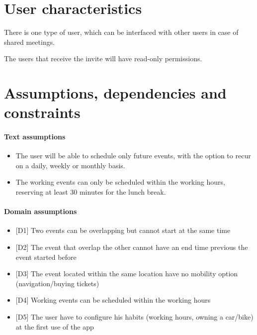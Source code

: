 \section{User characteristics}
\label{sec:usercharacteristics}
\begin{description}
	\item There is one type of user, which can be interfaced with other users in case of shared meetings. 
	\item The users that receive the invite will have read-only permissions.
\end{description}

\section{Assumptions, dependencies and constraints}
\label{sec:assumpdepenconst}

\paragraph{Text assumptions}
\begin{itemize}
	\item The user will be able to schedule only future events, with the option to recur on a daily, weekly or monthly basis.
	\item The working events can only be scheduled within the working hours, reserving at least 30 minutes for the lunch break.
\end{itemize}

\paragraph{Domain assumptions}
\begin{itemize}
	\item {[D1]} Two events can be overlapping but cannot start at the same time
	\item {[D2]} The event that overlap the other cannot have an end time previous the event started before
	\item {[D3]} The event located within the same location have no mobility option (navigation/buying tickets)
	\item {[D4]} Working events can be scheduled within the working hours
	\item {[D5]} The user have to configure his habits (working hours, owning a car/bike) at the first use of the app
\end{itemize}


